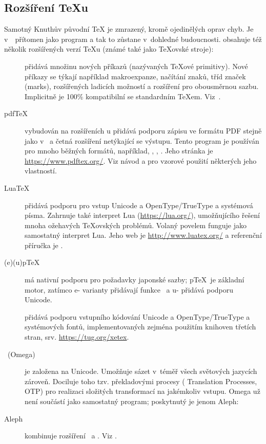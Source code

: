 \documentclass[\classoptions,slovak,english,czech]{\classname}
\begin{document}
\subsection{Rozšíření \protect\TeX{}u}
\label{sec:tex-extensions}

Samotný Knuthův původní \TeX{} je zmrazený, kromě ojedinělých oprav chyb.
Je v~\TL\ přítomen jako program  a tak to zůstane
v~dohledné budoucnosti. \TL{} obsahuje též několik rozšířených verzí 
\TeX{}u (známé také jako \TeX{}ovské stroje):

\begin{description}

\item [\eTeX] přidává množinu nových
příkazů (nazývaných \TeX{}ové primitivy).
\label{text:etex}
Nové příkazy se týkají například makroexpanze, načítání znaků,
tříd značek (marks), rozšířených ladicích možností
a rozšíření \TeXXeT{} pro obousměrnou sazbu. Implicitně
je \eTeX{} 100\% kompatibilní se standardním \TeX{}em.
Viz~. 

\item [pdf\TeX] vybudován na rozšířeních \eTeX{}u přidává podporu 
zápisu ve formátu PDF stejně jako v~\dvi{} a 
četná rozšíření netýkající se výstupu. 
Tento program je používán pro mnoho běžných formátů, 
například, , , .
Jeho stránka je \url{https://www.pdftex.org/}. Viz 
návod 
a 
pro vzorové použití některých jeho vlastností.  

\item [Lua\TeX] přidává podporu pro vstup Unicode a OpenType\slash TrueType
a systémová písma. Zahrnuje také interpret Lua
(\url{https://lua.org/}), umožňujícího řešení mnoha ožehavých \TeX ovských
problémů. Volaný povelem  funguje jako samostatný
interpret Lua. Jeho web je \url{http://www.luatex.org/} a
referenční příručka je . 

\item [(e)(u)p\TeX] má nativní podporu pro požadavky japonské sazby; 
p\TeX\ je základní motor, zatímco e- varianty přidávají funkce \eTeX\ a u- přidává podporu Unicode. 

\item [\XeTeX] přidává podporu vstupního kódování
Unicode a OpenType\slash TrueType a systémových fontů, implementovaných
zejména použitím knihoven třetích stran, srv. \url{https://tug.org/xetex}.

\item [\OMEGA\ (Omega)] je založena na Unicode.  
Umožňuje sázet v~téměř všech světových jazycích zároveň.
Dociluje toho tzv. překladovými procesy (\OMEGA{} Translation
Processes, OTP) pro realizaci složitých transformací na jakémkoliv vstupu. 
Omega už není součástí \TL{} jako samostatný program;
poskytnutý je jenom Aleph:

\item [Aleph] kombinuje rozšíření \OMEGA\ a \eTeX.  
Viz .
\end{description}
\end{document}

